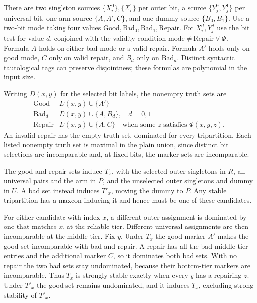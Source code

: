 \documentclass[11pt,a4paper]{amsart}
\begin{document}
There are two singleton sources \(\{X_i^0\},\{X_i^1\}\) per outer
bit, a source \(\{Y_j^0,Y_j^1\}\) per universal bit, one arm
source \(\{A,A',C\}\), and one dummy source \(\{B_0,B_1\}\).
Use a two-bit mode taking four values \(\mathrm{Good},\mathrm{Bad}_0,
\mathrm{Bad}_1,\mathrm{Repair}\).
For \(X_i^d,Y_j^d\) use the bit test for value \(d\), conjoined with
the validity condition \(\mathrm{mode}\ne\mathrm{Repair}\lor\Phi\).
Formula \(A\) holds on either bad mode or a valid repair.
Formula \(A'\) holds only on good mode, \(C\) only on valid
repair, and \(B_d\) only on \(\mathrm{Bad}_d\).
Distinct syntactic tautological tags can preserve disjointness;
these formulas are polynomial in the input size.

Writing \(D(x,y)\) for the selected bit labels, the nonempty truth
sets are
\[
\begin{array}{c|l}
\mathrm{Good} & D(x,y)\cup\{A'\}\\
\mathrm{Bad}_d & D(x,y)\cup\{A,B_d\},\quad d=0,1\\
\mathrm{Repair} & D(x,y)\cup\{A,C\}\quad
                   \text{when some }z\text{ satisfies }\Phi(x,y,z).
\end{array}
\]
An invalid repair has the empty truth set, dominated for every
tripartition. Each listed nonempty truth set is maximal in the
plain union, since distinct bit selections are incomparable and,
at fixed bits, the marker sets are incomparable.

The good and repair sets induce \(T_x\), with the selected outer
singletons in \(R\), all universal pairs and the arm in \(P\), and
the unselected outer singletons and dummy in \(U\).
A bad set instead induces \(T'_x\), moving the dummy to \(P\).
Any stable tripartition has a maxcon inducing it and hence must
be one of these candidates.

For either candidate with index \(x\), a different outer assignment
is dominated by one that matches \(x\), at the reliable tier.
Different universal assignments are then incomparable at the middle
tier. Fix \(y\). Under \(T_x\) the good marker \(A'\) makes the good
set incomparable with bad and repair. A repair has all the bad
middle-tier entries and the additional marker \(C\), so it dominates
both bad sets. With no repair the two bad sets stay undominated,
because their bottom-tier markers are incomparable. Thus \(T_x\)
is strongly stable exactly when every \(y\) has a repairing \(z\).
Under \(T'_x\) the good set remains undominated, and it induces
\(T_x\), excluding strong stability of \(T'_x\).
\end{document}
